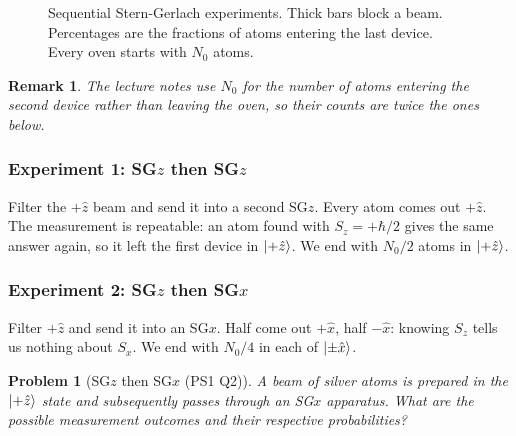 \documentclass{article}
\newtheorem{problem}{Problem}
\newtheorem{remark}{Remark}
\begin{document}
\begin{figure}[H]
{%
}
\caption{Sequential Stern-Gerlach experiments. Thick bars block a beam. Percentages are the fractions of atoms entering the last device. Every oven starts with $N_0$ atoms.}
\label{fig:sequential-sg}
\end{figure}
\begin{remark}
    The lecture notes use $N_0$ for the number of atoms entering the \emph{second} device rather than leaving the oven, so their counts are twice the ones below.
\end{remark}

\subsubsection{\texorpdfstring{Experiment 1: SG$z$ then SG$z$}{Experiment 1: SGz then SGz}}
Filter the $+\hat{z}$ beam and send it into a second SG$z$. Every atom comes out $+\hat{z}$. The measurement is repeatable: an atom found with $S_z = +\hbar/2$ gives the same answer again, so it left the first device in $\ket{+\hat{z}}$. We end with $N_0/2$ atoms in $\ket{+\hat{z}}$.

\subsubsection{\texorpdfstring{Experiment 2: SG$z$ then SG$x$}{Experiment 2: SGz then SGx}}
Filter $+\hat{z}$ and send it into an SG$x$. Half come out $+\hat{x}$, half $-\hat{x}$: knowing $S_z$ tells us nothing about $S_x$. We end with $N_0/4$ in each of $\ket{\pm\hat{x}}$.
\begin{problem}[SG$z$ then SG$x$ (PS1 Q2)]
    A beam of silver atoms is prepared in the $\ket{+\hat{z}}$ state and subsequently passes through an SG$x$ apparatus. What are the possible measurement outcomes and their respective probabilities?
\end{problem}
\end{document}

